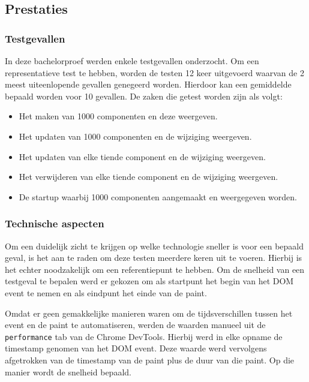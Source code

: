 \subsection{Prestaties}

\subsubsection{Testgevallen}

In deze bachelorproef werden enkele testgevallen onderzocht. Om een representatieve test te hebben, worden de testen 12 keer uitgevoerd waarvan de 2 meest uiteenlopende gevallen genegeerd worden. Hierdoor kan een gemiddelde bepaald worden voor 10 gevallen. De zaken die getest worden zijn als volgt: 

\begin{itemize}
    \item Het maken van 1000 componenten en deze weergeven.
    \item Het updaten van 1000 componenten en de wijziging weergeven.
    \item Het updaten van elke tiende component en de wijziging weergeven.
    \item Het verwijderen van elke tiende component en de wijziging weergeven.
    \item De startup waarbij 1000 componenten aangemaakt en weergegeven worden.
\end{itemize}

\subsubsection{Technische aspecten}

Om een duidelijk zicht te krijgen op welke technologie sneller is voor een bepaald geval, is het aan te raden om deze testen meerdere keren uit te voeren. Hierbij is het echter noodzakelijk om een referentiepunt te hebben. Om de snelheid van een testgeval te bepalen werd er gekozen om als startpunt het begin van het DOM event te nemen en als eindpunt het einde van de paint. 

Omdat er geen gemakkelijke manieren waren om de tijdsverschillen tussen het event en de paint te automatiseren, werden de waarden manueel uit de \texttt{performance} tab van de Chrome DevTools. Hierbij werd in elke opname de timestamp genomen van het DOM event. Deze waarde werd vervolgens afgetrokken van de timestamp van de paint plus de duur van die paint. Op die manier wordt de snelheid bepaald. 

